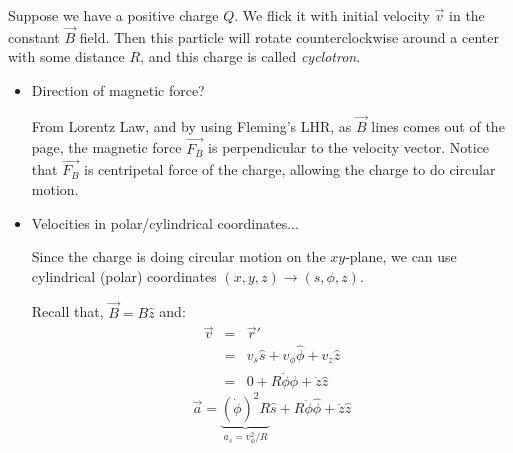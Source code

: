 \documentclass[12pt,a4paper,twoside]{article}
\numberwithin{equation}{section}
\begin{document}
    \noindent Suppose we have a positive charge $Q$. We flick it with initial velocity $\overrightarrow{v}$ in the constant $\overrightarrow{B}$ field. Then this particle will rotate counterclockwise around a center with some distance $R$, and this charge is called \textit{cyclotron}.
    
    \begin{itemize}
        \item Direction of magnetic force?
        
        From Lorentz Law, and by using Fleming's LHR, as $\overrightarrow{B}$ lines comes out of the page, the magnetic force $\overrightarrow{F_B}$ is perpendicular to the velocity vector. Notice that $\overrightarrow{F_B}$ is centripetal force of the charge, allowing the charge to do circular motion.
        
        \item Velocities in polar/cylindrical coordinates...
        
        Since the charge is doing circular motion on the $xy$-plane, we can use cylindrical (polar) coordinates $(x,y,z)\to(s,\phi, z)$.
        
        Recall that, $\overrightarrow{B}=B\hat{z}$ and:
        \begin{eqnarray*}
            \overrightarrow{v} &=& \overrightarrow{r}'\\
                               &=& v_s\hat{s} + v_\phi\hat{\phi}+v_z\hat{z}\\
                               &=& 0 + R\dot{\phi}\hat{\phi}+\dot{z}\hat{z}
        \end{eqnarray*}
        \begin{equation*}
            \overrightarrow{a} = \underbrace{(\dot{\phi})^2R}_{a_s=v_\phi^2/R}\hat{s}+R\ddot{\phi}\hat{\phi}+\ddot{z}\hat{z}
        \end{equation*}
        

\end{itemize}
\end{document}
